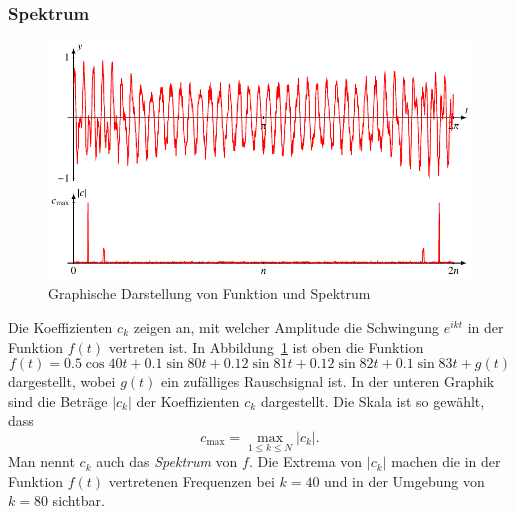 \subsubsection{Spektrum}
\begin{figure}
\centering
\includegraphics{chapters/6/spektrum.pdf}
\caption{Graphische Darstellung von Funktion und Spektrum
\label{skript:komplex:spektrum}}
\end{figure}
Die Koeffizienten $c_k$ zeigen an, mit welcher Amplitude die Schwingung
$e^{ikt}$ in der Funktion $f(t)$ vertreten ist.
In Abbildung~\ref{skript:komplex:spektrum} ist oben die Funktion 
\[
f(t)
=
0.5 \cos 40t
+0.1\sin 80t
+0.12\sin 81t
+0.12\sin 82t
+0.1\sin 83t
+g(t)
\]
dargestellt, wobei $g(t)$ ein zufälliges Rauschsignal ist.
In der unteren Graphik sind die Beträge $|c_k|$ der Koeffizienten $c_k$ 
dargestellt.
Die Skala ist so gewählt, dass
\[
c_{\text{max}} = \max_{1\le k\le N} |c_k|.
\]
Man nennt $c_k$ auch das {\em Spektrum} von $f$.
%
Die Extrema von $|c_k|$ machen die in der Funktion $f(t)$ vertretenen
Frequenzen bei $k=40$ und in der Umgebung von $k=80$ sichtbar.

